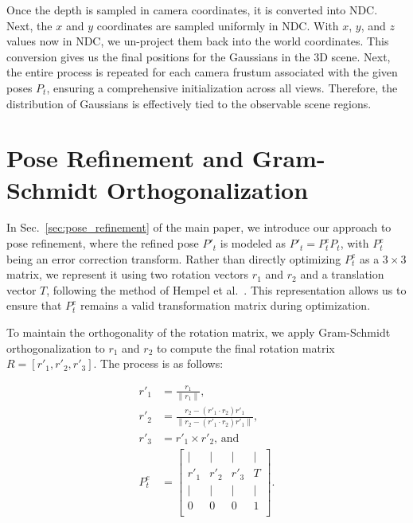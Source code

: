 Once the depth is sampled in camera coordinates, it is converted into NDC. Next, the $x$ and $y$ coordinates are sampled uniformly in NDC. With $x$, $y$, and $z$ values now in NDC, we un-project them back into the world coordinates. This conversion gives us the final positions for the Gaussians in the 3D scene.
Next, the entire process is repeated for each camera frustum associated with the given poses $P_t$, ensuring a comprehensive initialization across all views. Therefore, the distribution of Gaussians is effectively tied to the observable scene regions. 

\section{Pose Refinement and Gram-Schmidt Orthogonalization}
\label{sec:supp_pose_refinement}

In Sec.~\ref{sec:pose_refinement} of the main paper, we introduce our approach to pose refinement, where the refined pose $P'_t$ is modeled as $P'_t = P^e_t P_t$, with $P^e_t$ being an error correction transform. Rather than directly optimizing $P^e_t$ as a $3{\times}3$ matrix, we represent it using two rotation vectors $r_1$ and $r_2$ and a translation vector $T$, following the method of Hempel et al.~\cite{6d_rotation}. This representation allows us to ensure that $P^e_t$ remains a valid transformation matrix during optimization. 

To maintain the orthogonality of the rotation matrix, we apply Gram-Schmidt orthogonalization to $r_1$ and $r_2$ to compute the final rotation matrix $R = [r'_1, r'_2, r'_3]$. The process is as follows:


\allowdisplaybreaks
\begin{equation}
\begin{aligned}
    r'_1 &= \frac{r_1}{\|r_1\|}, \\
    r'_2 &= \frac{r_2 - (r'_1 \cdot r_2)r'_1}{\|r_2 - (r'_1 \cdot r_2)r'_1\|},\\
    r'_3 &= r'_1 \times r'_2, \,\text{and}\\
    P^e_t &= 
    \begin{bmatrix}
    | & | & | & |\\
    r'_1 & r'_2 & r'_3 & T\\
    | & | & | & |\\
    0 & 0 & 0 & 1\\
    \end{bmatrix}.    
\end{aligned}
\end{equation}


